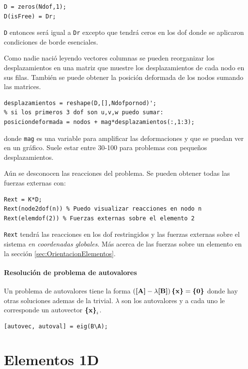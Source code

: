 \begin{lstlisting}[caption={Recuperación de desplazamientos globales.}]
D = zeros(Ndof,1);
D(isFree) = Dr;
\end{lstlisting}
\texttt{D} entonces será igual a \texttt{Dr} excepto que tendrá ceros en los dof donde se aplicaron condiciones de borde esenciales.

Como nadie nació leyendo vectores columnas se pueden reorganizar los desplazamientos en una matriz que muestre los desplazamientos de cada nodo en sus filas. También se puede obtener la posición deformada de los nodos sumando las matrices.
\begin{lstlisting}[caption={Obtención de posición deformada.}]
desplazamientos = reshape(D,[],Ndofpornod)';
% si los primeros 3 dof son u,v,w puedo sumar:
posiciondeformada = nodos + mag*desplazamientos(:,1:3); 
\end{lstlisting}
 donde \texttt{mag} es una variable para amplificar las deformaciones y que se puedan ver en un gráfico. Suele estar entre 30-100 para problemas con pequeños desplazamientos.

Aún se desconocen las reacciones del problema. Se pueden obtener todas las fuerzas externas con:
\begin{lstlisting}[caption = {Obtención de reacciones.}]
Rext = K*D;
Rext(node2dof(n)) % Puedo visualizar reacciones en nodo n
Rext(elemdof(2)) % Fuerzas externas sobre el elemento 2
\end{lstlisting}
\texttt{Rext} tendrá las reacciones en los dof restringidos y las fuerzas externas sobre el sistema \textit{en coordenadas globales}. Más acerca de las fuerzas sobre un elemento en la sección \ref{sec:OrientacionElementos}.

\subsection*{Resolución de problema de autovalores}
Un problema de autovalores tiene la forma $\left(\boldsymbol{[}\mathbf{A} \boldsymbol{]} - \lambda \boldsymbol{[}\mathbf{B} \boldsymbol{]} \right) \boldsymbol{\{ }\mathbf{x} \boldsymbol{\}} = \boldsymbol{\{ }\mathbf{0} \boldsymbol{\}}$ donde hay otras soluciones ademas de la trivial. $\lambda$ son los autovalores y a cada uno le corresponde un autovector $\boldsymbol{\{ }\mathbf{x} \boldsymbol{\}}_i$.

\begin{lstlisting}[caption={Resolución de problema de autovalores}]
[autovec, autoval] = eig(B\A);
\end{lstlisting}
\clearpage

\part{Elementos 1D}

